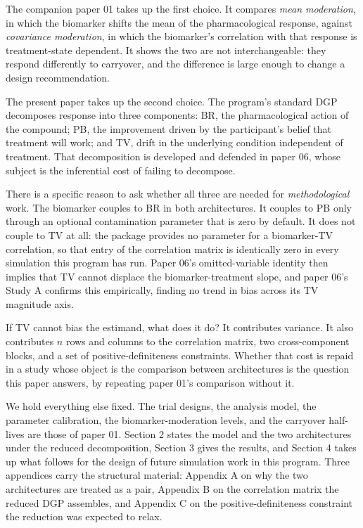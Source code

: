 \documentclass[
  11pt,
]{article}
\begin{document}
The companion paper 01 takes up the first choice. It compares
\emph{mean moderation}, in which the biomarker shifts the mean of the
pharmacological response, against \emph{covariance moderation}, in
which the biomarker's correlation with that response is
treatment-state dependent. It shows the two are not interchangeable:
they respond differently to carryover, and the difference is large
enough to change a design recommendation.

The present paper takes up the second choice. The program's standard
DGP decomposes response into three components: BR, the
pharmacological action of the compound; PB, the improvement driven by
the participant's belief that treatment will work; and TV, drift in
the underlying condition independent of treatment. That decomposition
is developed and defended in paper 06, whose subject is the
inferential cost of failing to decompose.

There is a specific reason to ask whether all three are needed for
\emph{methodological} work. The biomarker couples to BR in both
architectures. It couples to PB only through an optional
contamination parameter that is zero by default. It does not couple
to TV at all: the package provides no parameter for a biomarker-TV
correlation, so that entry of the correlation matrix is identically
zero in every simulation this program has run. Paper 06's
omitted-variable identity then implies that TV cannot displace the
biomarker-treatment slope, and paper 06's Study A confirms this
empirically, finding no trend in bias across its TV magnitude axis.

If TV cannot bias the estimand, what does it do? It contributes
variance. It also contributes \(n\) rows and columns to the correlation
matrix, two cross-component blocks, and a set of
positive-definiteness constraints. Whether that cost is repaid in a
study whose object is the comparison between architectures is the
question this paper answers, by repeating paper 01's comparison
without it.

We hold everything else fixed. The trial designs, the analysis model,
the parameter calibration, the biomarker-moderation levels, and the
carryover half-lives are those of paper 01. Section 2 states the
model and the two architectures under the reduced decomposition,
Section 3 gives the results, and Section 4 takes up what follows for
the design of future simulation work in this program. Three
appendices carry the structural material: Appendix A on why the two
architectures are treated as a pair, Appendix B on the correlation
matrix the reduced DGP assembles, and Appendix C on the
positive-definiteness constraint the reduction was expected to
relax.
\end{document}
